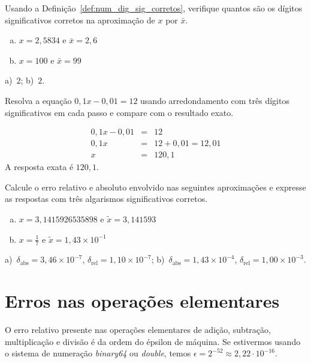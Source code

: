 \begin{exer}
Usando a Definição~\ref{def:num_dig_sig_corretos}, verifique quantos são os dígitos significativos corretos na aproximação de $x$ por $\bar{x}$.
\begin{enumerate}[a)]
\item $x=2,5834$ e $\bar{x}=2,6$
\item $x=100$ e $\bar{x}=99$
\end{enumerate}
\end{exer}
\begin{resp}
  a)~$2$; b)~$2$.
\end{resp}

\begin{exer} Resolva a equação $0,1x-0,01=12$ usando arredondamento com três dígitos significativos em cada passo e compare com o resultado exato.
\end{exer}
\begin{resp}
 \begin{eqnarray}
  0,1x-0,01&=&12\\
  0,1x&=&12+0,01=12,01\\
  x&=&120,1
 \end{eqnarray}
A resposta exata é $120,1$.
\end{resp}


\begin{exer} Calcule o erro relativo e absoluto envolvido nas seguintes aproximações e expresse as respostas com três algarismos significativos corretos.
    \begin{enumerate}[a)]
    \item $x=3,1415926535898$ e $\tilde{x}=3,141593$
    \item $x=\frac{1}{7}$ e $\tilde{x}=1,43\times 10^{-1}$
    \end{enumerate}
\end{exer}
\begin{resp}
    a)~$\delta_{\mbox{abs}}=3,46\times 10^{-7}$, $\delta_{\mbox{rel}}=1,10\times 10^{-7}$; b)~$\delta_{\mbox{abs}}=1,43\times 10^{-4}$, $\delta_{\mbox{rel}} = 1,00 \times 10^{-3}$.
\end{resp}



\section{Erros nas operações elementares}
O erro relativo presente nas operações elementares de adição, subtração, multiplicação e divisão é da ordem do épsilon de máquina. Se estivermos usando o sistema de numeração {\it binary64} ou {\it double}, temos $\epsilon = 2^{-52} \approx 2,22\cdot 10^{-16}$.

